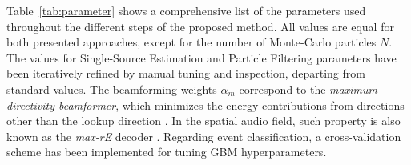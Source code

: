 
Table~\ref{tab:parameter} shows a comprehensive list of the parameters used throughout the different steps of the proposed method. All values are equal for both presented approaches, except for the number of Monte-Carlo particles $N$. 
The values for Single-Source Estimation and Particle Filtering parameters have been iteratively refined by manual tuning and inspection, departing from standard values. 
The beamforming weights $\alpha_m$ correspond to the \textit{maximum directivity beamformer}, which minimizes the energy contributions from directions other than the lookup direction \cite{rafaely2015fundamentals}. In the spatial audio field, such property is also known as the \textit{max-rE} decoder \cite{daniel2000representation}. 
Regarding event classification, a cross-validation scheme has been implemented for tuning GBM hyperparameters. 




